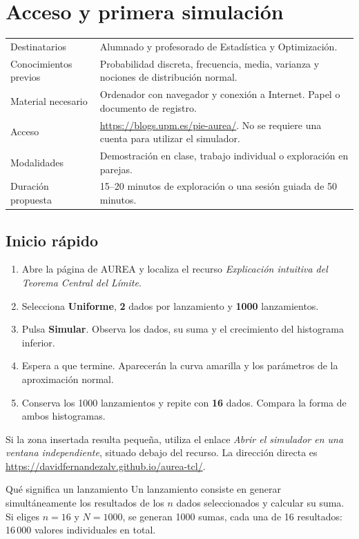 \documentclass[11pt,a4paper]{article}
\newcommand{\web}{\url{https://blogs.upm.es/pie-aurea/}}
\begin{document}
\section{Acceso y primera simulación}
\begin{tabularx}{\textwidth}{@{}p{39mm}Y@{}}\toprule
Destinatarios & Alumnado y profesorado de Estadística y Optimización.\\
Conocimientos previos & Probabilidad discreta, frecuencia, media, varianza y nociones de distribución normal.\\
Material necesario & Ordenador con navegador y conexión a Internet. Papel o documento de registro.\\
Acceso & \web. No se requiere una cuenta para utilizar el simulador.\\
Modalidades & Demostración en clase, trabajo individual o exploración en parejas.\\
Duración propuesta & 15--20 minutos de exploración o una sesión guiada de 50 minutos.\\\bottomrule
\end{tabularx}

\subsection{Inicio rápido}
\begin{enumerate}
\item Abre la página de AUREA y localiza el recurso \emph{Explicación intuitiva del Teorema Central del Límite}.
\item Selecciona \textbf{Uniforme}, \textbf{2} dados por lanzamiento y \textbf{1000} lanzamientos.
\item Pulsa \textbf{Simular}. Observa los dados, su suma y el crecimiento del histograma inferior.
\item Espera a que termine. Aparecerán la curva amarilla y los parámetros de la aproximación normal.
\item Conserva los 1000 lanzamientos y repite con \textbf{16} dados. Compara la forma de ambos histogramas.
\end{enumerate}

Si la zona insertada resulta pequeña, utiliza el enlace \emph{Abrir el simulador en una ventana independiente}, situado debajo del recurso. La dirección directa es \url{https://davidfernandezalv.github.io/aurea-tcl/}.

\begin{nota}{Qué significa un lanzamiento}
Un lanzamiento consiste en generar simultáneamente los resultados de los $n$ dados seleccionados y calcular su suma. Si eliges $n=16$ y $N=1000$, se generan 1000 sumas, cada una de 16 resultados: 16\,000 valores individuales en total.
\end{nota}
\end{document}
